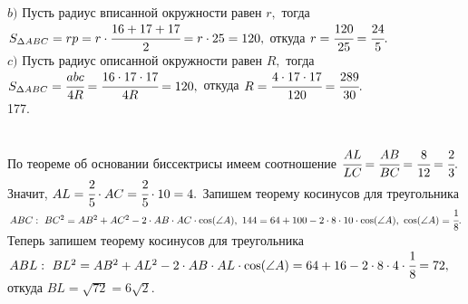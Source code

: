 \documentclass[12pt]{article}
\begin{document}
$b)$ Пусть радиус вписанной окружности равен $r,$ тогда $S_{\Delta ABC}=rp=r\cdot\cfrac{16+17+17}{2}=r\cdot25=120,$ откуда $r=\cfrac{120}{25}=\cfrac{24}{5}.$\\
$c)$ Пусть радиус описанной окружности равен $R,$ тогда $S_{\Delta ABC}=\cfrac{abc}{4R}=\cfrac{16\cdot17\cdot17}{4R}=120,$ откуда $R=\cfrac{4\cdot17\cdot17}{120}=\cfrac{289}{30}.$\\
177. \begin{figure}[ht!]
\end{figure}\\
По теореме об основании биссектрисы имеем соотношение $\cfrac{AL}{LC}=\cfrac{AB}{BC}=\cfrac{8}{12}=\cfrac{2}{3}.$ Значит, $AL=\cfrac{2}{5}\cdot AC=\cfrac{2}{5}\cdot10=4.$ Запишем теорему косинусов для треугольника $ABC:\ BC^2=AB^2+AC^2-2\cdot AB\cdot AC\cdot \cos(\angle A),\ 144=64+100-2\cdot8\cdot10\cdot
\cos(\angle A),\ \cos(\angle A)=\cfrac{1}{8}.$ Теперь запишем теорему косинусов для треугольника $ABL:\ BL^2=AB^2+AL^2-2\cdot AB\cdot AL\cdot \cos(\angle A)=
64+16-2\cdot8\cdot4\cdot\cfrac{1}{8}=72,$ откуда $BL=\sqrt{72}=6\sqrt{2}.$\newpage\noindent
\end{document}
